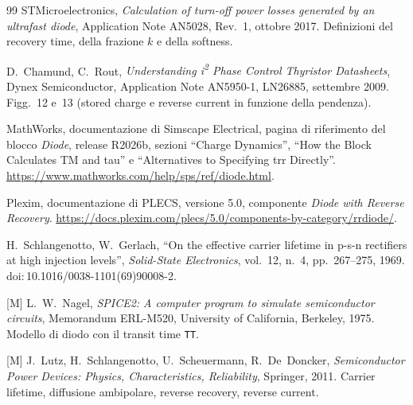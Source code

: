 \documentclass[10pt,a4paper]{scrartcl}
\begin{document}
\begin{thebibliography}{99}
STMicroelectronics, \emph{Calculation of turn-off power losses generated by an ultrafast diode}, Application Note AN5028, Rev.~1, ottobre 2017. Definizioni del recovery time, della frazione $k$ e della softness.

D.~Chamund, C.~Rout, \emph{Understanding i\textsuperscript{2} Phase Control Thyristor Datasheets}, Dynex Semiconductor, Application Note AN5950-1, LN26885, settembre 2009. Figg.~12 e~13 (stored charge e reverse current in funzione della pendenza).

MathWorks, documentazione di Simscape Electrical, pagina di riferimento del blocco \emph{Diode}, release R2026b, sezioni ``Charge Dynamics'', ``How the Block Calculates TM and tau'' e ``Alternatives to Specifying trr Directly''. \url{https://www.mathworks.com/help/sps/ref/diode.html}.

Plexim, documentazione di PLECS, versione 5.0, componente \emph{Diode with Reverse Recovery}. \url{https://docs.plexim.com/plecs/5.0/components-by-category/rrdiode/}.

H.~Schlangenotto, W.~Gerlach, ``On the effective carrier lifetime in p-s-n rectifiers at high injection levels'', \emph{Solid-State Electronics}, vol.~12, n.~4, pp.~267--275, 1969. doi:\,10.1016/0038-1101(69)90008-2.

[M] L.~W.~Nagel, \emph{SPICE2: A computer program to simulate semiconductor circuits}, Memorandum ERL-M520, University of California, Berkeley, 1975. Modello di diodo con il transit time \texttt{TT}.

[M] J.~Lutz, H.~Schlangenotto, U.~Scheuermann, R.~De~Doncker, \emph{Semiconductor Power Devices: Physics, Characteristics, Reliability}, Springer, 2011. Carrier lifetime, diffusione ambipolare, reverse recovery, reverse current.

\end{thebibliography}
\end{document}
